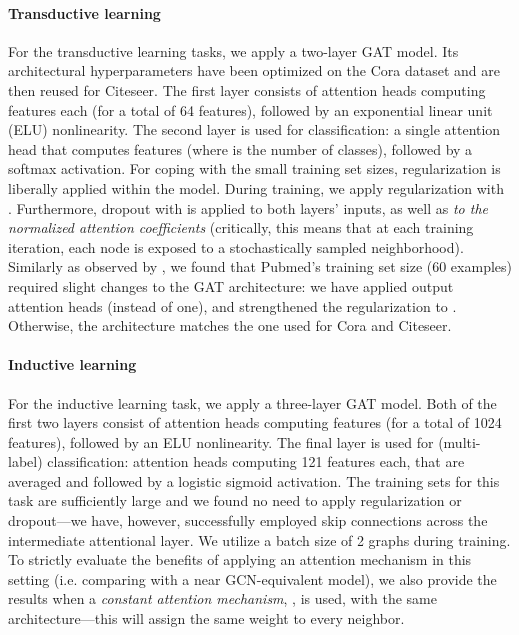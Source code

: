 \documentclass{article} \usepackage{iclr2018_conference,times}
\begin{document}
\paragraph{Transductive learning} 
For the transductive learning tasks, we apply a two-layer GAT model. Its architectural hyperparameters have been optimized on the Cora dataset and are then reused for Citeseer. The first layer consists of  attention heads computing  features each (for a total of 64 features), followed by an exponential linear unit (ELU) \citep{clevert2015fast} nonlinearity. The second layer is used for classification: a single attention head that computes  features (where  is the number of classes), followed by a softmax activation. For coping with the small training set sizes, regularization is liberally applied within the model. During training, we apply  regularization with . Furthermore, dropout \citep{srivastava2014dropout} with  is applied to both layers' inputs, as well as \emph{to the normalized attention coefficients} (critically, this means that at each training iteration, each node is exposed to a stochastically sampled neighborhood). Similarly as observed by \cite{monti2016geometric}, we found that Pubmed's training set size (60 examples) required slight changes to the GAT architecture: we have applied  output attention heads (instead of one), and strengthened the  regularization to . Otherwise, the architecture matches the one used for Cora and Citeseer.

\paragraph{Inductive learning} 
For the inductive learning task, we apply a three-layer GAT model. Both of the first two layers consist of  attention heads computing  features (for a total of 1024 features), followed by an ELU nonlinearity. The final layer is used for (multi-label) classification:  attention heads computing 121 features each, that are averaged and followed by a logistic sigmoid activation. The training sets for this task are sufficiently large and we found no need to apply  regularization or dropout---we have, however, successfully employed skip connections \citep{he2016deep} across the intermediate attentional layer. We utilize a batch size of 2 graphs during training. To strictly evaluate the benefits of applying an attention mechanism in this setting (i.e. comparing with a near GCN-equivalent model), we also provide the results when a \emph{constant attention mechanism}, , is used, with the same architecture---this will assign the same weight to every neighbor.
\end{document}

